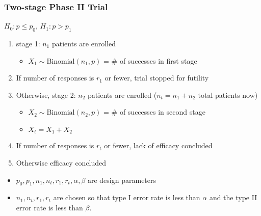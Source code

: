\documentclass{beamer}\usepackage[]{graphicx}\usepackage[]{color}
\begin{document}
\begin{frame}
\frametitle{Two-stage Phase II Trial}
 $H_0: p \leq p_0$, $H_1: p > p_1$ %
    \begin{enumerate} %
        \item stage 1: $n_1$ patients are enrolled
          \begin{itemize}
            \item $X_1 \sim \mbox{Binomial}(n_1,p)$ = \# of successes in first stage
          \end{itemize}
        \item If number of responses is $r_1$ or fewer, trial stopped for futility
        \item Otherwise, stage 2: $n_2$ patients are enrolled ($n_t = n_1 + n_2$ total patients now)
          \begin{itemize}
            \item $X_2 \sim \mbox{Binomial}(n_2,p)$ = \# of successes in second stage
            \item $X_t = X_1 + X_2$
          \end{itemize}
        \item If number of responses is $r_t$ or fewer, lack of efficacy concluded
        \item Otherwise efficacy concluded
    \end{enumerate}
    \begin{itemize}
      \item $p_0, p_1, n_1, n_t, r_1, r_t, \alpha,\beta$ are design parameters
      \item $n_1, n_t, r_1, r_t$ are chosen so that type I error rate is less than $\alpha$ and the type II error rate is less than $\beta$.
    \end{itemize}
\end{frame}

\end{document}
